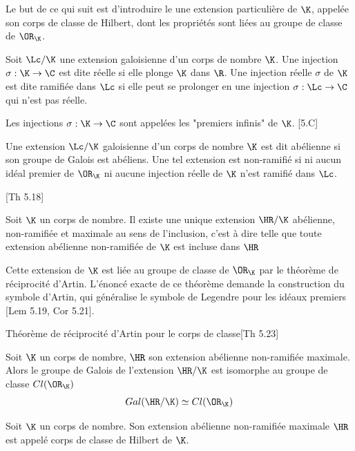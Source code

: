Le but de ce qui suit est d'introduire le une extension particulière de $\K$, appelée son corps de classe de Hilbert, dont les propriétés sont liées au groupe de classe de $\OR_{\K}$.

\begin{Def} Soit $\Lc/\K$ une extension galoisienne d'un corps de nombre  $\K$. Une injection $\sigma :\K\rightarrow\C$ est dite réelle si elle plonge $\K$ dans $\R$. Une injection réelle $\sigma$ de $\K$ est dite ramifiée dans $\Lc$ si elle peut se prolonger en une injection $\sigma :\Lc\rightarrow\C$ qui n'est pas réelle. 
\end{Def}

\begin{Rem}
	Les injections $\sigma :\K\rightarrow\C$ sont appelées les "premiers infinis" de $\K$. \cite{Cox}[5.C]
\end{Rem}

\begin{Def}
	Une extension $\Lc/\K$ galoisienne d'un corps de nombre $\K$ est dit abélienne si son groupe de Galois est abéliens. Une tel extension est non-ramifié si ni aucun idéal premier de $\OR_{\K}$ ni aucune injection réelle de $\K$ n'est ramifié dans $\Lc$.
\end{Def}

\begin{The}\cite{Cox}[Th 5.18]
	
	Soit $\K$ un corps de nombre. Il existe une unique extension $\HR/\K$ abélienne, non-ramifiée et maximale au sens de l'inclusion, c'est à dire telle que toute extension abélienne non-ramifiée de $\K$ est incluse dans $\HR$
\end{The}

Cette extension de $\K$ est liée au groupe de classe de $\OR_{\K}$ par le théorème de réciprocité d'Artin. L'énoncé exacte de ce théorème demande la construction du symbole d'Artin, qui généralise le symbole de Legendre pour les idéaux premiers \cite{Cox}[Lem 5.19, Cor 5.21]. 

\begin{The}{Théorème de réciprocité d'Artin pour le corps de classe}\cite{Cox}[Th 5.23]
	
	Soit $\K$ un corps de nombre, $\HR$ son extension abélienne non-ramifiée maximale. Alors le groupe de Galois de l'extension $\HR/\K$ est isomorphe au groupe de classe $Cl(\OR_{\K})$
	\begin{equation*}
		Gal(\HR/\K)\simeq Cl(\OR_{\K})
	\end{equation*}
\end{The} 

\begin{Def}
	Soit $\K$ un corps de nombre. Son extension abélienne non-ramifiée maximale $\HR$ est appelé corps de classe de Hilbert de $\K$.
\end{Def}